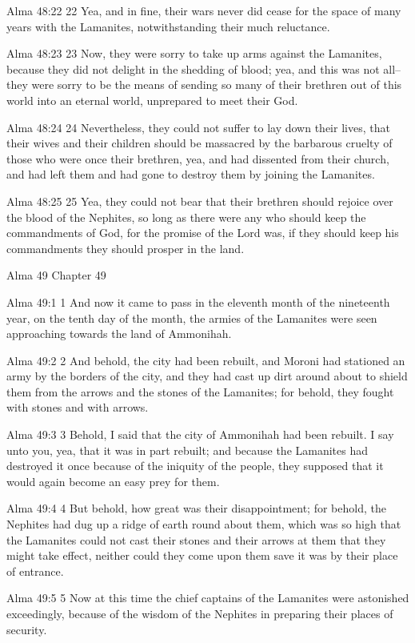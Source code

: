 Alma 48:22
 22 Yea, and in fine, their wars never did cease for the space of
many years with the Lamanites, notwithstanding their much
reluctance.

Alma 48:23
 23 Now, they were sorry to take up arms against the Lamanites,
because they did not delight in the shedding of blood; yea, and
this was not all--they were sorry to be the means of sending so
many of their brethren out of this world into an eternal world,
unprepared to meet their God.

Alma 48:24
 24 Nevertheless, they could not suffer to lay down their lives,
that their wives and their children should be massacred by the
barbarous cruelty of those who were once their brethren, yea, and
had dissented from their church, and had left them and had gone
to destroy them by joining the Lamanites.

Alma 48:25
 25 Yea, they could not bear that their brethren should rejoice
over the blood of the Nephites, so long as there were any who
should keep the commandments of God, for the promise of the Lord
was, if they should keep his commandments they should prosper in
the land.

Alma 49
Chapter 49

Alma 49:1
 1 And now it came to pass in the eleventh month of the
nineteenth year, on the tenth day of the month, the armies of the
Lamanites were seen approaching towards the land of Ammonihah.

Alma 49:2
 2 And behold, the city had been rebuilt, and Moroni had
stationed an army by the borders of the city, and they had cast
up dirt around about to shield them from the arrows and the
stones of the Lamanites; for behold, they fought with stones and
with arrows.

Alma 49:3
 3 Behold, I said that the city of Ammonihah had been rebuilt. I
say unto you, yea, that it was in part rebuilt; and because the
Lamanites had destroyed it once because of the iniquity of the
people, they supposed that it would again become an easy prey for
them.

Alma 49:4
 4 But behold, how great was their disappointment; for behold,
the Nephites had dug up a ridge of earth round about them, which
was so high that the Lamanites could not cast their stones and
their arrows at them that they might take effect, neither could
they come upon them save it was by their place of entrance.

Alma 49:5
 5 Now at this time the chief captains of the Lamanites were
astonished exceedingly, because of the wisdom of the Nephites in
preparing their places of security.

